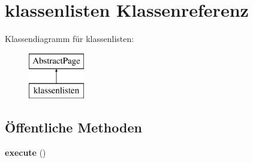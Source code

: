 \hypertarget{classklassenlisten}{}\section{klassenlisten Klassenreferenz}
\label{classklassenlisten}
Klassendiagramm für klassenlisten\+:\begin{figure}[H]
\begin{center}
\leavevmode
\includegraphics[height=2.000000cm]{classklassenlisten}
\end{center}
\end{figure}
\subsection*{Öffentliche Methoden}
\begin{DoxyCompactItemize}
\item 
\mbox{\label{classklassenlisten_aa665e3e820497b7e6fd035b88b7493df}} 
{\bfseries execute} ()
\end{DoxyCompactItemize}
